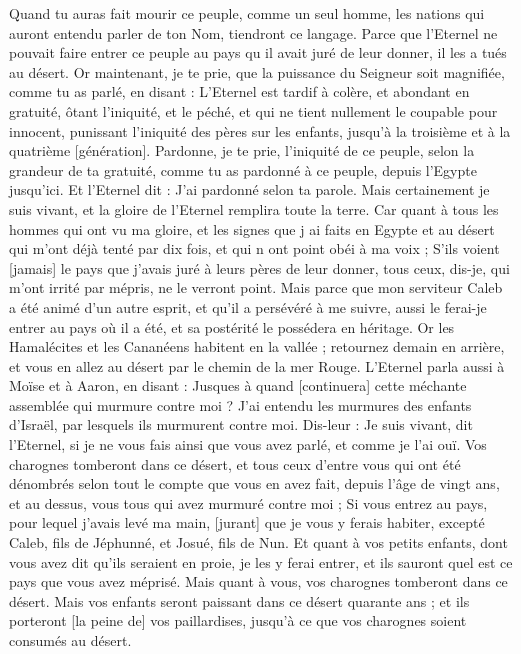\begin{multicols}{2}
Quand tu auras fait mourir ce peuple, comme un seul homme, les nations qui auront entendu parler de ton Nom, tiendront ce langage.
Parce que l'Eternel ne pouvait faire entrer ce peuple au pays qu il avait juré de leur donner, il les a tués au désert.
Or maintenant, je te prie, que la puissance du Seigneur soit magnifiée, comme tu as parlé, en disant :
L'Eternel est tardif à colère, et abondant en gratuité, ôtant l'iniquité, et le péché, et qui ne tient nullement le coupable pour innocent, punissant l'iniquité des pères sur les enfants, jusqu'à la troisième et à la quatrième [génération].
Pardonne, je te prie, l'iniquité de ce peuple, selon la grandeur de ta gratuité, comme tu as pardonné à ce peuple, depuis l'Egypte jusqu'ici.
Et l'Eternel dit : J'ai pardonné selon ta parole.
Mais certainement je suis vivant, et la gloire de l'Eternel remplira toute la terre.
Car quant à tous les hommes qui ont vu ma gloire, et les signes que j ai faits en Egypte et au désert qui m'ont déjà tenté par dix fois, et qui n ont point obéi à ma voix ;
S'ils voient [jamais] le pays que j'avais juré à leurs pères de leur donner, tous ceux, dis-je, qui m'ont irrité par mépris, ne le verront point.
Mais parce que mon serviteur Caleb a été animé d'un autre esprit, et qu'il a persévéré à me suivre, aussi le ferai-je entrer au pays où il a été, et sa postérité le possédera en héritage.
Or les Hamalécites et les Cananéens habitent en la vallée ; retournez demain en arrière, et vous en allez au désert par le chemin de la mer Rouge.
L'Eternel parla aussi à Moïse et à Aaron, en disant :
Jusques à quand [continuera] cette méchante assemblée qui murmure contre moi ? J'ai entendu les murmures des enfants d'Israël, par lesquels ils murmurent contre moi.
Dis-leur : Je suis vivant, dit l'Eternel, si je ne vous fais ainsi que vous avez parlé, et comme je l'ai ouï.
Vos charognes tomberont dans ce désert, et tous ceux d'entre vous qui ont été dénombrés selon tout le compte que vous en avez fait, depuis l'âge de vingt ans, et au dessus, vous tous qui avez murmuré contre moi ;
Si vous entrez au pays, pour lequel j'avais levé ma main, [jurant] que je vous y ferais habiter, excepté Caleb, fils de Jéphunné, et Josué, fils de Nun.
Et quant à vos petits enfants, dont vous avez dit qu'ils seraient en proie, je les y ferai entrer, et ils sauront quel est ce pays que vous avez méprisé.
Mais quant à vous, vos charognes tomberont dans ce désert.
Mais vos enfants seront paissant dans ce désert quarante ans ; et ils porteront [la peine de] vos paillardises, jusqu'à ce que vos charognes soient consumés au désert.

\end{multicols}
